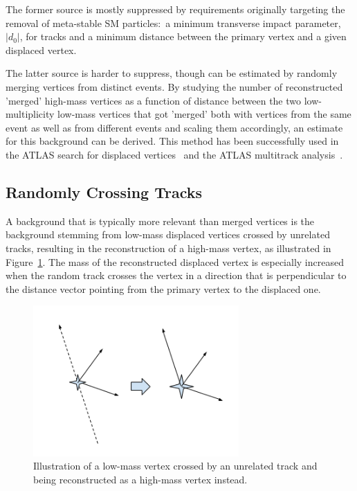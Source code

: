The former source is mostly suppressed by requirements originally targeting the removal of meta-stable SM particles:~a minimum transverse impact parameter, $|d_0|$, for tracks and a minimum distance between the primary vertex and a given displaced vertex.

The latter source is harder to suppress, though can be estimated by randomly merging vertices from distinct events. By studying the number of reconstructed 'merged' high-mass vertices as a function of distance between the two low-multiplicity low-mass vertices that got 'merged' both with vertices from the same event as well as from different events and scaling them accordingly, an estimate for this background can be derived. This method has been successfully used in the ATLAS search for displaced vertices~\cite{Aaboud:2017iio} and the ATLAS multitrack analysis~\cite{Aad:2015rba}.

\subsection{Randomly Crossing Tracks} %

A background that is typically more relevant than merged vertices is the background stemming from low-mass displaced vertices crossed by unrelated tracks, resulting in the reconstruction of a high-mass vertex, as illustrated in Figure~\ref{fig:randomcrossing}. The mass of the reconstructed displaced vertex is especially increased when the random track crosses the vertex in a direction that is perpendicular to the distance vector pointing from the primary vertex to the displaced one.

\begin{figure}[h]
  \centering
  \includegraphics[width=0.7\textwidth]{figures/randomcrossing.png}
  \caption{Illustration of a low-mass vertex crossed by an unrelated track and being reconstructed as a high-mass vertex instead.}
  \label{fig:randomcrossing}
\end{figure}

